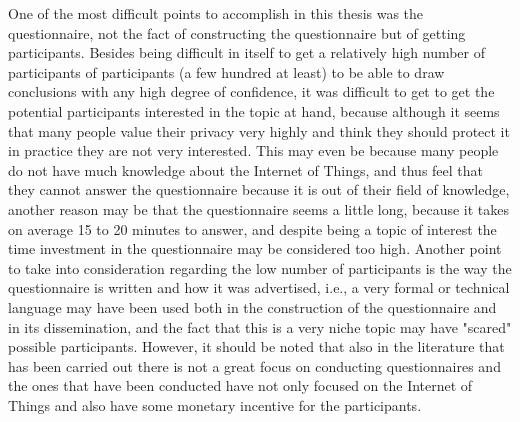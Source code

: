 One of the most difficult points to accomplish in this thesis was the
questionnaire, not the fact of constructing the questionnaire but of
getting participants. Besides being difficult in itself to get a relatively
high number of participants of participants (a few hundred at least)
to be able to draw conclusions with any high degree of confidence, it was
difficult to get to get the potential participants interested in the topic
at hand, because although it seems that many people value their privacy very
highly and think they should protect it in practice they are not very
interested. This may even be because many people do not have much knowledge
about the Internet of Things, and thus feel that they cannot answer the
questionnaire because it is out of their field of knowledge, another
reason may be that the questionnaire seems a little long, because it
takes on average 15 to 20 minutes to answer, and despite being a topic
of interest the time investment in the questionnaire may be considered
too high. Another point to take into consideration regarding the low
number of participants is the way the questionnaire is written and how
it was advertised, i.e., a very formal or technical language may have
been used both in the construction of the questionnaire and in its
dissemination, and the fact that this is a very niche topic may have
"scared" possible participants. However, it should be noted that also
in the literature that has been carried out there is not a great focus
on conducting questionnaires and the ones that have been conducted have
not only focused on the Internet of Things and also have some monetary
incentive for the participants.

